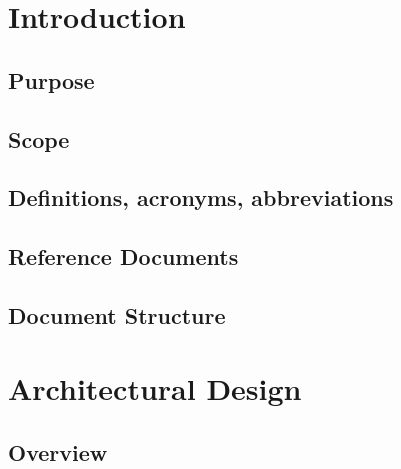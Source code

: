 \documentclass[12pt, a4paper]{article}
\title{
	\Huge{\textbf{\centerline{myTaxiService}}}
	\newline
	\huge{\textbf{D}esign \textbf{D}ocument}
}
\author{
	Monica Magoni 854091
	\\
	Alberto Cibari 852689
}
\date{\today}
\begin{document}
	\maketitle
	\newpage
	\renewcommand*\contentsname{\Huge{Contents}}
	\tableofcontents
	
	\newpage
	
    \section{Introduction}
    	
    	\subsection{Purpose}
    	
    	
    	\subsection{Scope}
    	
    	
    	\subsection{Definitions, acronyms, abbreviations}
    	
    
        \subsection{Reference Documents}
    	
    
    	\subsection{Document Structure}
    	
    	
    	
    \newpage
    \section{Architectural Design}
    
    	\subsection{Overview}
    	    
    	
\end{document}
